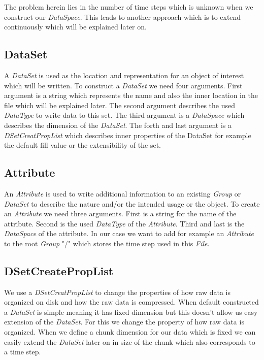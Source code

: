 \documentclass{article}
\begin{document}
The problem herein lies in the number of time steps which is unknown when we construct our \textit{DataSpace}. This leads to another approach which is to extend continuously which will be explained later on.
\subsection{DataSet}
A \textit{DataSet} is used as the location and representation for an object of interest which will be written. To construct a \textit{DataSet} we need four arguments. First argument is a string which represents the name and also the inner location in the file which will be explained later. The second argument describes the used \textit{DataType} to write data to this set. The third argument is a \textit{DataSpace} which describes the dimension of the \textit{DataSet}. The forth and last argument is a \textit{DSetCreatPropList} which describes inner properties of the DataSet for example the default fill value or the extensibility of the set.
\subsection{Attribute}
An \textit{Attribute} is used to write additional information to an existing \textit{Group} or \textit{DataSet} to describe the nature and/or the intended usage or the object. To create an \textit{Attribute} we need three arguments. First is a string for the name of the attribute. Second is the used \textit{DataType} of the \textit{Attribute}. Third and last is the \textit{DataSpace} of the attribute. In our case we want to add for example an \textit{Attribute} to the root \textit{Group} "/" which stores the time step used in this \textit{File}.
\subsection{DSetCreatePropList}
We use a \textit{DSetCreatPropList} to change the properties of how raw data is organized on disk and how the raw data is compressed. When default constructed a \textit{DataSet} is simple meaning it has fixed dimension but this doesn't allow us easy extension of the \textit{DataSet}. For this we change the property of how raw data is organized. When we define a chunk dimension for our data which is fixed we can easily extend the \textit{DataSet} later on in size of the chunk which also corresponds to a time step.
\end{document}
